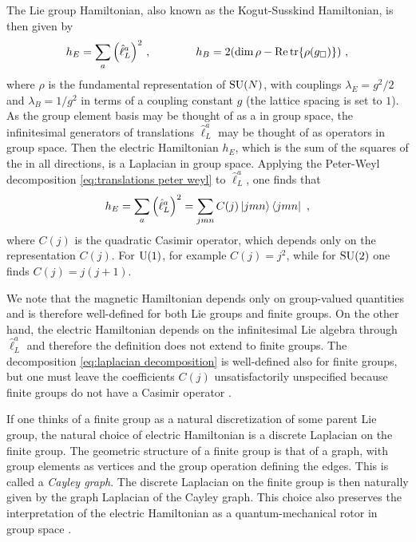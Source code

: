 The Lie group Hamiltonian, also known as the Kogut-Susskind Hamiltonian, is then given by \cite{kogut1975hamiltonian, milstead2018qyangmills}
\begin{equation}
    \label{eq:kog suss hE hB}
    h_E = \sum_{a} \pqty{\hat{\ell}^a_L}^2 \ , \quad \quad \quad \quad h_B = 2(\dim{\rho} - \Re \tr{\rho(g_\square)}) \ ,
\end{equation}
where $\rho$ is the fundamental representation of $\text{SU}(N)$, with couplings $\lambda_E = g^2/2$ and $\lambda_B = 1/g^2$ in terms of a coupling constant $g$ (the lattice spacing is set to $1$). As the group element basis may be thought of as a  in group space, the infinitesimal generators of translations $\hat{\ell}_L^a$ may be thought of as  operators in group space.
Then the electric Hamiltonian $h_E$, which is the sum of the squares of the  in all directions, is a Laplacian in group space.
Applying the Peter-Weyl decomposition \eqref{eq:translations peter weyl} to $\hat{\ell}_L^a$, one finds that \cite{milstead2018qyangmills,marianithesis}
\begin{equation}
    \label{eq:laplacian decomposition}
    h_E = \sum_{a} \pqty{\hat{\ell}^a_L}^2 = \sum_{jmn} C(j) \ket{jmn}\bra{jmn} \ ,
\end{equation}
where $C(j)$ is the quadratic Casimir operator, which depends only on the representation $C(j)$.
For $\mathrm{U}(1)$, for example $C(j)=j^2$, while for $\text{SU}(2)$ one finds $C(j) = j(j+1)$.

\medskip

We note that the magnetic Hamiltonian depends only on group-valued quantities and is therefore well-defined for both Lie groups and finite groups.
On the other hand, the electric Hamiltonian depends on the infinitesimal Lie algebra through $\hat{\ell}_L^a$ and therefore the definition does not extend to finite groups.
The decomposition \eqref{eq:laplacian decomposition} is well-defined also for finite groups, but one must leave the coefficients $C(j)$ unsatisfactorily unspecified because finite groups do not have a Casimir operator \cite{zohar2015latticegauge}.

If one thinks of a finite group as a natural discretization of some parent Lie group, the natural choice of electric Hamiltonian is a discrete Laplacian on the finite group.
The geometric structure of a finite group is that of a graph, with group elements as vertices and the group operation defining the edges.
This is called a \textit{Cayley graph}.
The discrete Laplacian on the finite group is then naturally given by the graph Laplacian of the Cayley graph.
This choice also preserves the interpretation of the electric Hamiltonian as a quantum-mechanical rotor in group space \cite{kogut1975hamiltonian}.

